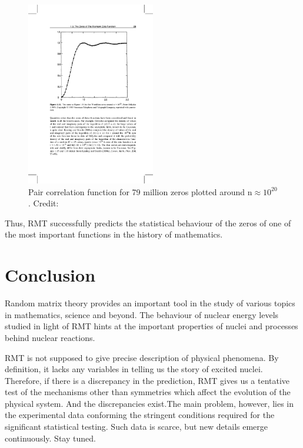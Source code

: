 \begin{figure}[H]
\includegraphics[width=0.5\textwidth]{7}
\centering
\caption{Pair correlation function for 79 million zeros plotted around n$\approx10^{20}$. Credit:\cite{od01}}
\label{fig:7}
\end{figure}

Thus, RMT successfully predicts the statistical behaviour of the zeros of one of the most important functions in the history of mathematics.
\section*{Conclusion}
Random matrix theory provides an important tool in the study of various topics in mathematics, science and beyond. The behaviour of nuclear energy levels studied in light of RMT hints at the important properties of nuclei and processes behind nuclear reactions. 

RMT is not supposed to give precise description of physical phenomena. By definition, it lacks any variables in telling us the story of excited nuclei. Therefore, if there is a discrepancy in the prediction, RMT gives us a tentative test of the mechanisms other than symmetries which affect the evolution of the physical system. And the discrepancies  exist.The main problem, however, lies in the experimental data conforming the stringent conditions required for the significant statistical testing. Such data is scarce, but new details emerge continuously. Stay tuned.
\printbibliography
%
